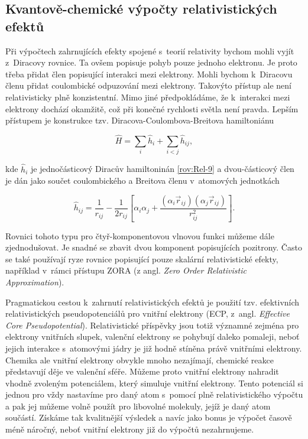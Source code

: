 \subsection{Kvantově-chemické výpočty relativistických efektů}

Při výpočtech zahrnujících efekty spojené s~teorií relativity bychom mohli vyjít z~Diracovy rovnice. Ta ovšem popisuje pohyb pouze jednoho elektronu. Je proto třeba přidat člen popisující interakci mezi elektrony. Mohli bychom k~Diracovu členu přidat coulombické odpuzování mezi elektrony. Takovýto přístup ale není relativisticky plně konzistentní. Mimo jiné předpokládáme, že k~interakci mezi elektrony dochází okamžitě, což při konečné rychlosti světla není pravda. Lepším přístupem je konstrukce tzv. Diracova-Coulombova-Breitova hamiltoniánu

\begin{equation}
\hat{H} = \sum_i \hat{h}_i + \sum_{i<j} \hat{h}_{ij},
\label{rov:Rel-12}
\end{equation}

\noindent kde $\hat{h}_i$ je jednočásticový Diracův hamiltoninán \eqref{rov:Rel-9} a dvou-částicový člen je dán jako součet coulombického a Breitova členu v~atomových jednotkách

\begin{equation}
\hat{h}_{ij} = \frac{1}{r_{ij}} - \frac{1}{2 r_{ij}} \left[ \alpha_i \alpha_j + \frac{(\alpha_i \vec{r}_{ij})(\alpha_j \vec{r}_{ij})}{r_{ij}^2} \right].
\label{rov:Rel-13}
\end{equation}

Rovnici tohoto typu pro čtyř-komponentovou vlnovou funkci můžeme dále zjednodušovat. Je snadné se zbavit dvou komponent popisujících pozitrony. Často se také používají ryze rovnice popisující pouze skalární relativistické efekty, například v~rámci přístupu ZORA (z angl. \textit{Zero Order Relativistic Approximation}).

Pragmatickou cestou k~zahrnutí relativistických efektů je použití tzv. efektivních relativistických pseudopotenciálů pro vnitřní elektrony (ECP, z~angl. \textit{Effective Core Pseudopotential}). Relativistické příspěvky jsou totiž významné zejména pro elektrony vnitřních slupek, valenční elektrony se pohybují daleko pomaleji, neboť jejich interakce s~atomovými jádry je již hodně stíněna právě vnitřními elektrony. Chemika ale vnitřní elektrony obvykle mnoho nezajímají, chemické reakce představují děje ve valenční sféře. Můžeme proto vnitřní elektrony nahradit vhodně zvoleným potenciálem, který simuluje vnitřní elektrony. Tento potenciál si jednou pro vždy nastavíme pro daný atom s~pomocí plně relativistického výpočtu a pak jej můžeme volně použít pro libovolné molekuly, jejíž je daný atom součástí. Získáme tak kvalitnější výsledek a navíc jako bonus je výpočet časově méně náročný, neboť vnitřní elektrony již do výpočtů nezahrnujeme.         
  
